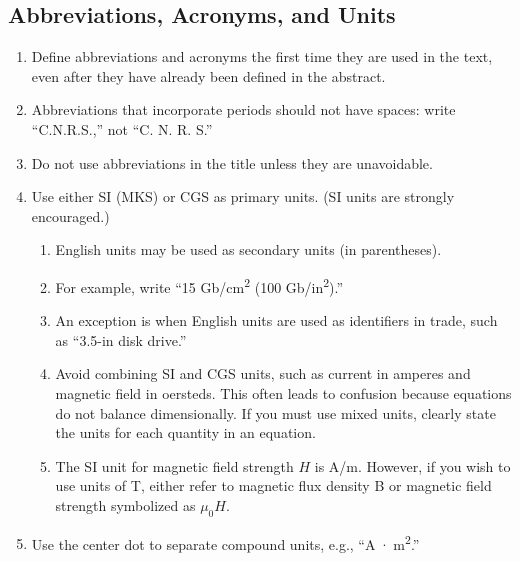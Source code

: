 \subsection{Abbreviations, Acronyms, and Units}

\begin{enumerate}
	\item  Define abbreviations and acronyms the first time they are used in the text, even after they have already been defined in the abstract. 
	
	\item Abbreviations that incorporate periods should not have spaces: write ``C.N.R.S.,'' not ``C. N. R. S.'' 
	
	\item Do not use abbreviations in the title unless they are unavoidable.

	\item Use either SI (MKS) or CGS as primary units. (SI units are strongly encouraged.) 
	
	\begin{enumerate}
		\item English units may be used as secondary units (in parentheses). 
	
		\item For example, write ``15 Gb/cm\textsuperscript{2} (100 Gb/in\textsuperscript{2}).'' 
		
		\item An exception is when English units are used as identifiers in trade, such as ``3.5-in disk drive.'' 
		
		\item Avoid combining SI and CGS units, such as current in amperes and magnetic field in oersteds. This often leads to confusion because equations do not balance dimensionally. If you must use mixed units, clearly state the units for each quantity in an equation.

		\item The SI unit for magnetic field strength $H$ is A/m. However, if you wish to use units of T, either refer to magnetic flux density B or magnetic field strength symbolized as $\mu_0 H$. 
		
		\end{enumerate}
		
	\item Use the center dot to separate compound units, e.g., ``A~$\cdot$~m\textsuperscript{2}.''
	
\end{enumerate}




